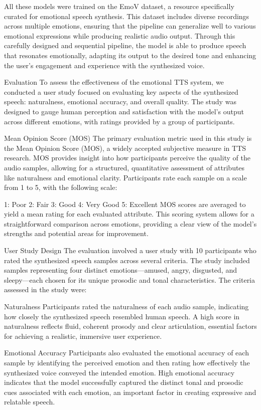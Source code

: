 All these models were trained on the EmoV dataset, a resource specifically curated for emotional speech synthesis. This dataset includes diverse recordings across multiple emotions, ensuring that the pipeline can generalize well to various emotional expressions while producing realistic audio output. Through this carefully designed and sequential pipeline, the model is able to produce speech that resonates emotionally, adapting its output to the desired tone and enhancing the user’s engagement and experience with the synthesized voice.

Evaluation
To assess the effectiveness of the emotional TTS system, we conducted a user study focused on evaluating key aspects of the synthesized speech: naturalness, emotional accuracy, and overall quality. The study was designed to gauge human perception and satisfaction with the model’s output across different emotions, with ratings provided by a group of participants.

Mean Opinion Score (MOS)
The primary evaluation metric used in this study is the Mean Opinion Score (MOS), a widely accepted subjective measure in TTS research. MOS provides insight into how participants perceive the quality of the audio samples, allowing for a structured, quantitative assessment of attributes like naturalness and emotional clarity. Participants rate each sample on a scale from 1 to 5, with the following scale:

1: Poor
2: Fair
3: Good
4: Very Good
5: Excellent
MOS scores are averaged to yield a mean rating for each evaluated attribute. This scoring system allows for a straightforward comparison across emotions, providing a clear view of the model’s strengths and potential areas for improvement.

User Study Design
The evaluation involved a user study with 10 participants who rated the synthesized speech samples across several criteria. The study included samples representing four distinct emotions—amused, angry, disgusted, and sleepy—each chosen for its unique prosodic and tonal characteristics. The criteria assessed in the study were:

Naturalness
Participants rated the naturalness of each audio sample, indicating how closely the synthesized speech resembled human speech. A high score in naturalness reflects fluid, coherent prosody and clear articulation, essential factors for achieving a realistic, immersive user experience.

Emotional Accuracy
Participants also evaluated the emotional accuracy of each sample by identifying the perceived emotion and then rating how effectively the synthesized voice conveyed the intended emotion. High emotional accuracy indicates that the model successfully captured the distinct tonal and prosodic cues associated with each emotion, an important factor in creating expressive and relatable speech.

